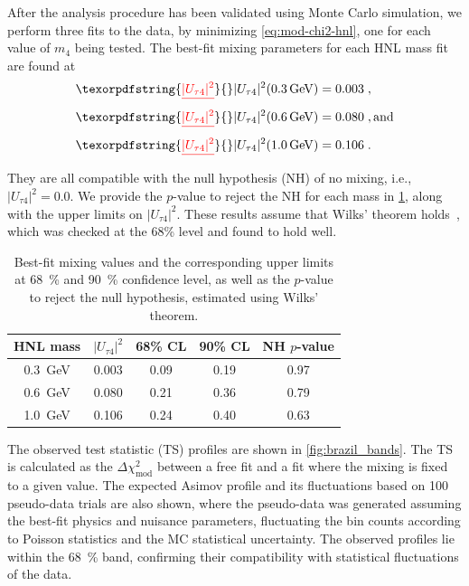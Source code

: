 \documentclass[
    aps,
    prd,
    reprint,
    amsmath,
    amssymb,
    nofootinbib,
    linenumbers,
    superscriptaddress,
    floatfix
]{revtex4-2}
\newcommand{\gev}{\giga\electronvolt}
\def\ut4{$|U_{\tau4}|^2$}
\def\nomathut4{|U_{\tau4}|^2}
\renewcommand{\rm}{\mathrm}
\newcommand{\rm}{\mathrm}
\providecommand{\DIFdeltex}[1]{{\protect\color{red}\sout{#1}}}                      %
\providecommand{\DIFaddbegin}{} %
\providecommand{\DIFaddend}{} %
\providecommand{\DIFdelbegin}{} %
\providecommand{\DIFdelend}{} %
\providecommand{\DIFdel}[1]{\texorpdfstring{\DIFdeltex{#1}}{}} %
\newcommand{\DIFscaledelfig}{0.5}
\newlength{\DIFdelgraphicswidth} %
\newlength{\DIFdelgraphicsheight} %
\newcommand{\DIFaddincludegraphics}[2][]{{\color{blue}\fbox{\DIFOincludegraphics[#1]{#2}}}} %
\newcommand{\DIFdelincludegraphics}[2][]{%
\sbox{\DIFdelgraphicsbox}{\DIFOincludegraphics[#1]{#2}}%
\settoboxwidth{\DIFdelgraphicswidth}{\DIFdelgraphicsbox} %
\settoboxtotalheight{\DIFdelgraphicsheight}{\DIFdelgraphicsbox} %
\scalebox{\DIFscaledelfig}{%
\parbox[b]{\DIFdelgraphicswidth}{\usebox{\DIFdelgraphicsbox}\\[-\baselineskip] \rule{\DIFdelgraphicswidth}{0em}}\llap{\resizebox{\DIFdelgraphicswidth}{\DIFdelgraphicsheight}{%
\setlength{\unitlength}{\DIFdelgraphicswidth}%
\begin{picture}(1,1)%
\thicklines\linethickness{2pt} %
{\color[rgb]{1,0,0}\put(0,0){\framebox(1,1){}}}%
{\color[rgb]{1,0,0}\put(0,0){\line( 1,1){1}}}%
{\color[rgb]{1,0,0}\put(0,1){\line(1,-1){1}}}%
\end{picture}%
}\hspace*{3pt}}} %
} %
\DeclareRobustCommand{\DIFaddbegin}{\DIFOaddbegin \let\includegraphics\DIFaddincludegraphics} %
\DeclareRobustCommand{\DIFaddend}{\DIFOaddend \let\includegraphics\DIFOincludegraphics} %
\DeclareRobustCommand{\DIFdelbegin}{\DIFOdelbegin \let\includegraphics\DIFdelincludegraphics} %
\DeclareRobustCommand{\DIFdelend}{\DIFOaddend \let\includegraphics\DIFOincludegraphics} %
\begin{document}
After the analysis procedure has been validated using Monte Carlo simulation, we perform three fits to the data, by minimizing \cref{eq:mod-chi2-hnl}, one for each value of $m_{4}$ being tested.
The best-fit mixing parameters for each HNL mass fit are found at
\begin{align*}
    \DIFdelbegin \DIFdel{|U_{\tau4}|^2}\DIFdelend \DIFaddbegin \nomathut4\DIFaddend (\SI{0.3}{\gev}) &= 0.003 \;, \\
    \DIFdelbegin \DIFdel{|U_{\tau4}|^2}\DIFdelend \DIFaddbegin \nomathut4\DIFaddend (\SI{0.6}{\gev}) &= 0.080 \;, \rm{and} \\
    \DIFdelbegin \DIFdel{|U_{\tau4}|^2}\DIFdelend \DIFaddbegin \nomathut4\DIFaddend (\SI{1.0}{\gev}) &= 0.106 \;.
\end{align*}
They are all compatible with the null hypothesis (NH) of no mixing, i.e., $\nomathut4=0.0$.
We provide the $p$-value to reject the NH for each mass in \cref{tab:best_fit_parameters_and_confidence_levels}, along with the upper limits on \ut4. 
These results assume that Wilks' theorem holds~\cite{wilks_theorem}, which was checked at the 68\% level and found to hold well.
\begin{table}[h]
    \begin{tabular}{ ccccc }
        \hline\hline
        \textbf{HNL mass} & \textbf{\ut4} & \textbf{68\% CL} & \textbf{90\% CL} & \textbf{NH $p$-value} \\    
        \hline\hline
        \SI{0.3}{\gev} & 0.003 & 0.09 & 0.19 & \SI{0.97}{} \\
        \SI{0.6}{\gev} & 0.080 & 0.21 & 0.36 & \SI{0.79}{} \\
        \SI{1.0}{\gev} & 0.106 & 0.24 & 0.40 & \SI{0.63}{} \\
        \hline
    \end{tabular}
    \internallinenumbers
    \caption{Best-fit mixing values and the corresponding upper limits at \SI{68}{\percent} and \SI{90}{\percent} confidence level, as well as the $p$-value to reject the null hypothesis, estimated using Wilks' theorem.}
    \label{tab:best_fit_parameters_and_confidence_levels}
\end{table}
The observed test statistic (TS) profiles are shown in \cref{fig:brazil_bands}. The TS is calculated as the $\Delta\chi^2_{\mathrm{mod}}$ between a free fit and a fit where the mixing is fixed to a given value.
The expected Asimov profile and its fluctuations based on 100 pseudo-data trials are also shown, where the pseudo-data was generated assuming the best-fit physics and nuisance parameters, fluctuating the bin counts according to Poisson statistics and the MC statistical uncertainty.
The observed profiles lie within the \SI{68}{\percent} band, confirming their compatibility with statistical fluctuations of the data.
\end{document}
